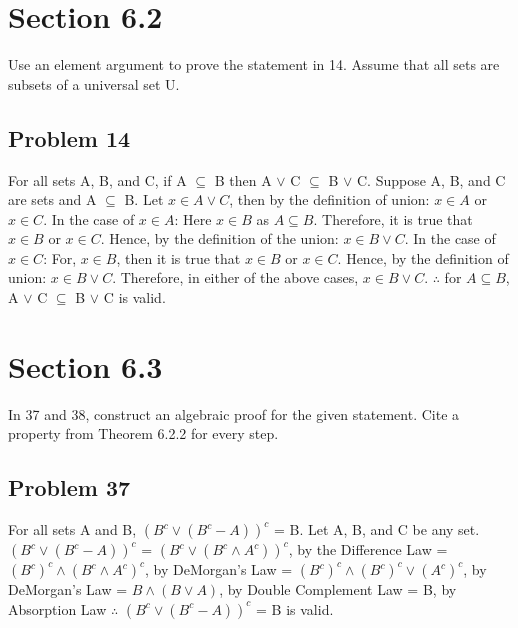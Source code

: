 \documentclass{article}
\begin{document}
	\section*{Section 6.2}
	Use an element argument to prove the statement in 14.
	Assume that all sets are subsets of a universal set U.
	\subsection*{Problem 14}
	For all sets A, B, and C, if A $\subseteq$ B then A $\lor$ C $\subseteq$ B $\lor$ C.
	\newline
	Suppose A, B, and C are sets and A $\subseteq$ B.
	\newline
	Let $x \in A \lor C$, then by the definition of union: $x \in A $ or $ x \in C$.
	\newline
	In the case of $x \in A$:
	\newline
	Here $x \in B$ as $A \subseteq B$.
	\newline
	Therefore, it is true that $x \in B$ or $x \in C$.
	\newline
	Hence, by the definition of the union: $x \in B \lor C$.
	\newline
	In the case of $x \in C$:
	\newline
	For, $x \in B$, then it is true that $x \in B$ or $x \in C$.
	\newline
	Hence, by the definition of union: $x \in B \lor C$.
	Therefore, in either of the above cases, $x \in B \lor C$.
	\newline
	$\therefore$ for $A \subseteq B$, A $\lor$ C $\subseteq$ B $\lor$ C is valid.
	
	\section*{Section 6.3}
	In 37 and 38, construct an algebraic proof for the given statement.
	Cite a property from Theorem 6.2.2 for every step.
	\subsection*{Problem 37}
	For all sets A and B, $(B^{c} \lor (B^{c} - A))^{c}$ = B.
	\newline
	Let A, B, and C be any set.
	\newline
	$(B^{c} \lor (B^{c} - A))^{c}$ = $(B^{c} \lor (B^{c} \land A^{c}))^{c}$, by the Difference Law
	\newline
	= $(B^{c})^{c} \land (B^{c} \land A^{c})^{c}$, by DeMorgan's Law
	\newline
	= $(B^{c})^{c} \land (B^{c})^{c} \lor (A^{c})^{c}$, by DeMorgan's Law
	\newline
	= $B \land (B \lor A)$, by Double Complement Law
	\newline
	= B, by Absorption Law
	\newline
	$\therefore$ $(B^{c} \lor (B^{c} - A))^{c}$ = B is valid.
\end{document}
